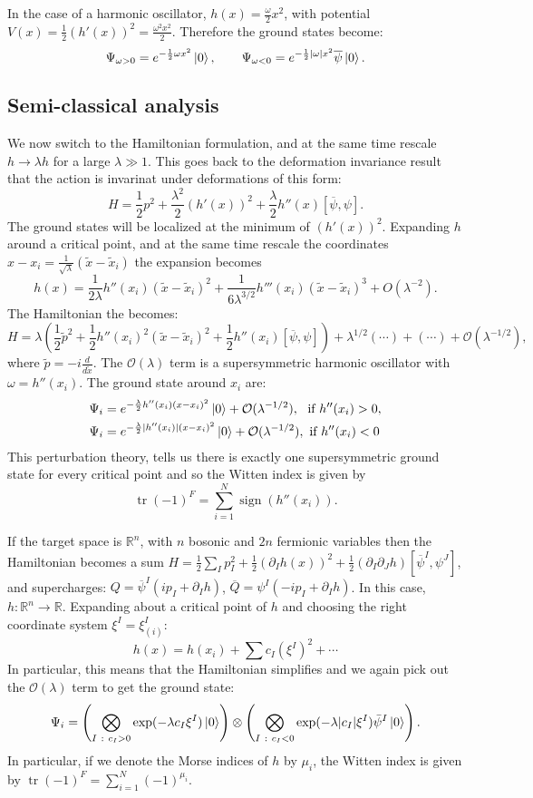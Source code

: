 \documentclass{report}
\theoremstyle{plain}
\theoremstyle{definition}
\theoremstyle{remark}
\newcommand{\di}{\partial}
\newcommand{\bR}{\mathbb{R}}
\newcommand{\mc}{\mathcal}
\newcommand{\cnj}{\overline}
\newcommand{\ten}{\otimes}
\newcommand{\lam}{\lambda}
\newcommand{\om}{\omega}
\newcommand{\FR}[2]{\frac{#1}{#2}}
\DeclareMathOperator{\Tr}{tr}
\DeclareMathOperator{\sign}{sign}
\begin{document}
In the case of a harmonic oscillator, $h(x) = \FR{\om}{2}x^2$, with
potential $V(x) = \FR{1}{2}(h'(x))^2 = \FR{\om^2x^2}{2}$. Therefore the
ground states become:
\[ \Psi_{\om>0} = e^{-\FR{1}{2}\om x^2}\ket 0,\qquad \Psi_{\om<0}=
e^{-\FR{1}{2}|\om|x^2}\cnj\psi\ket 0.\]


\subsection{Semi-classical analysis}
We now switch to the Hamiltonian formulation, and at the same time rescale
$h\to \lam h$ for a large $\lam \gg 1$. This goes back to the deformation
invariance result that the action is invarinat under deformations of this
form:
\[H=\FR{1}{2}p^2+\FR{\lam^2}{2}(h'(x))^2+\FR{\lam}{2}h''(x)[\cnj\psi,\psi].\]
The ground states will be localized at the minimum of $(h'(x))^2$.
Expanding $h$ around a critical point, and at the same time rescale the
coordinates $x-x_i = \FR{1}{\sqrt\lam}(\tilde x-\tilde x_i)$ the expansion
becomes \[h(x) = \FR{1}{2\lam}h''(x_i)(\tilde x-\tilde
x_i)^2+\FR{1}{6\lam^{3/2}}h'''(x_i)(\tilde x-\tilde x_i)^3 +
O(\lam^{-2}).\]
The Hamiltonian the becomes:
\[ H = \lam\left( \FR{1}{2}\tilde p^2 + \FR{1}{2}h''(x_i)^2(\tilde x-\tilde
    x_i)^2+\FR{1}{2}h''(x_i)\left[ \cnj\psi,\psi \right]\right)
+\lam^{1/2}(\cdots)+(\cdots)+\mc O(\lam^{-1/2}),\]
where $\tilde p = -i\FR{d}{d\tilde x}$.
The $\mc O(\lam)$ term is a supersymmetric harmonic oscillator with
$\om=h''(x_i)$. The ground state around $x_i$ are:
\begin{align*}
\Psi_i &= e^{-\FR{\lam}{2}h''(x_i)(x-x_i)^2}\ket 0+\mc O(\lam^{-1/2}),\ \ \text{if
$h''(x_i)>0$},\\
\Psi_i &= e^{-\FR{\lam}{2}|h''(x_i)|(x-x_i)^2}\ket 0+\mc O(\lam^{-1/2}),\ \text{if
$h''(x_i)<0$}
\end{align*}
This perturbation theory, tells us there is exactly one supersymmetric
ground state for every critical point and so the Witten index is given by
\[\Tr(-1)^F = \sum_{i=1}^N \sign(h''(x_i)).\]

If the target space is $\bR^n$, with $n$ bosonic and $2n$ fermionic
variables then the Hamiltonian becomes a sum $H = \FR{1}{2}\sum_I
p_I^2+\FR{1}{2}(\di_Ih(x))^2+\FR{1}{2}(\di_I\di_J h)[\cnj\psi^I,\psi^J]$,
and supercharges: $Q = \cnj\psi^I(ip_I+\di_Ih)$, $\cnj Q =
\psi^I(-ip_I+\di_Ih)$. In this case, $h:\bR^n \to \bR$. Expanding about a
critical point of $h$ and choosing the right coordinate system
$\xi^I=\xi^I_{(i)}$: \[ h(x)= h(x_i)+\sum c_I(\xi^I)^2+\cdots\]
In particular, this means that the Hamiltonian simplifies and we again pick
out the $\mc O(\lam)$ term to get the ground state:
\[\Psi_i = \left(\bigotimes_{I\ :\ c_I>0} \exp(-\lam c_I\xi^I)\ket 0\right)
\ten\left(\bigotimes_{I\ :\ c_I<0} \exp(-\lam|c_I|\xi^I)\bar\psi^I\ket0
\right).\] In particular, if we denote the Morse indices of $h$ by $\mu_i$,
the Witten index is given by $\Tr(-1)^F = \sum_{i=1}^N (-1)^{\mu_i}$.
\end{document}
